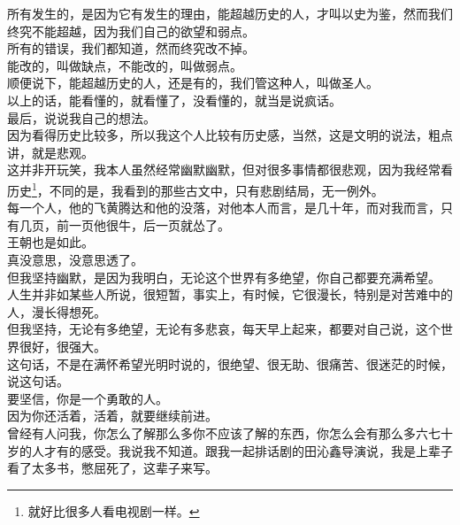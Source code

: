 \begin{multicols}{\theparacolNo}
所有发生的，是因为它有发生的理由，能超越历史的人，才叫以史为鉴，然而我们终究不能超越，因为我们自己的欲望和弱点。\\

所有的错误，我们都知道，然而终究改不掉。\\

能改的，叫做缺点，不能改的，叫做弱点。\\

顺便说下，能超越历史的人，还是有的，我们管这种人，叫做圣人。\\

以上的话，能看懂的，就看懂了，没看懂的，就当是说疯话。\\

最后，说说我自己的想法。\\

因为看得历史比较多，所以我这个人比较有历史感，当然，这是文明的说法，粗点讲，就是悲观。\\

这并非开玩笑，我本人虽然经常幽默幽默，但对很多事情都很悲观，因为我经常看历史\footnote{就好比很多人看电视剧一样。}，不同的是，我看到的那些古文中，只有悲剧结局，无一例外。\\

每一个人，他的飞黄腾达和他的没落，对他本人而言，是几十年，而对我而言，只有几页，前一页他很牛，后一页就怂了。\\

王朝也是如此。\\

真没意思，没意思透了。\\

但我坚持幽默，是因为我明白，无论这个世界有多绝望，你自己都要充满希望。\\

人生并非如某些人所说，很短暂，事实上，有时候，它很漫长，特别是对苦难中的人，漫长得想死。\\

但我坚持，无论有多绝望，无论有多悲哀，每天早上起来，都要对自己说，这个世界很好，很强大。\\

这句话，不是在满怀希望光明时说的，很绝望、很无助、很痛苦、很迷茫的时候，说这句话。\\

要坚信，你是一个勇敢的人。\\

因为你还活着，活着，就要继续前进。\\

曾经有人问我，你怎么了解那么多你不应该了解的东西，你怎么会有那么多六七十岁的人才有的感受。我说我不知道。跟我一起排话剧的田沁鑫导演说，我是上辈子看了太多书，憋屈死了，这辈子来写。\\


\end{multicols}
